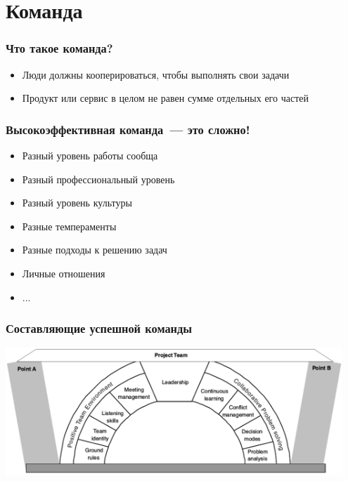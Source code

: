 \documentclass{../../slides-style}
\begin{document}
    \begin{frame}[plain]
        \titlepage
    \end{frame}

    \section{Команда}

    \begin{frame}
        \frametitle{Что такое команда?}
        \begin{itemize}
            \item Люди должны кооперироваться, чтобы выполнять свои задачи
            \item Продукт или сервис в целом не равен сумме отдельных его частей
        \end{itemize}
    \end{frame}

    \begin{frame}
        \frametitle{Высокоэффективная команда~--- это сложно!}
        \begin{itemize}
            \item Разный уровень работы сообща
            \item Разный профессиональный уровень
            \item Разный уровень культуры
            \item Разные темпераменты
            \item Разные подходы к решению задач
            \item Личные отношения
            \item ...
        \end{itemize}
    \end{frame}

    \begin{frame}
        \frametitle{Составляющие успешной команды}
        \begin{center}
            \includegraphics[width=0.95\textwidth]{successfulTeamComponents.png}
        \end{center}
    \end{frame}
\end{document}
